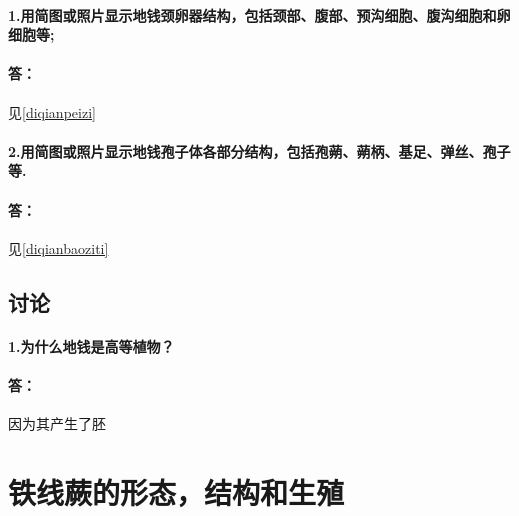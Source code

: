 \documentclass[utf8]{ctexart}
\begin{document}
        \paragraph*{1.用简图或照片显示地钱颈卵器结构，包括颈部、腹部、预沟细胞、腹沟细胞和卵细胞等;}
        \paragraph*{答：}见\ref{diqianpeizi}
        \paragraph*{2.用简图或照片显示地钱孢子体各部分结构，包括孢蒴、蒴柄、基足、弹丝、孢子等.}
        \paragraph*{答：}见\ref{diqianbaoziti}
    \subsection*{讨论}
        \paragraph*{1.为什么地钱是高等植物？}
        \paragraph*{答：}因为其产生了胚
    \section{铁线蕨的形态，结构和生殖}
\end{document}
